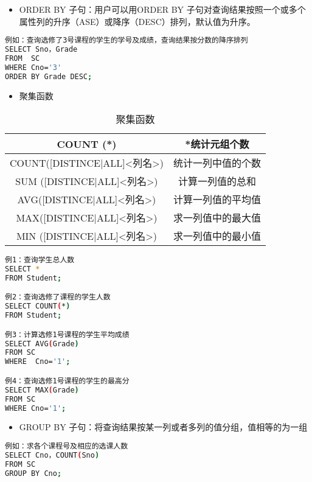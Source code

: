 \begin{itemize}
\item ORDER BY 子句：用户可以用ORDER BY 子句对查询结果按照一个或多个属性列的升序（ASE）或降序（DESC）排列，默认值为升序。
\end{itemize}


\begin{lstlisting}[language=bash]
例如：查询选修了3号课程的学生的学号及成绩，查询结果按分数的降序排列
SELECT Sno，Grade
FROM  SC
WHERE Cno='3'
ORDER BY Grade DESC;
\end{lstlisting}

\begin{itemize}
\item 聚集函数
\end{itemize}

\begin{table}[ht]
\centering
\caption{聚集函数}\label{tab_SQLgrm2}
\begin{tabular}{|c|c|}
\hline
COUNT (*) & *统计元组个数 \\
\hline
COUNT([DISTINCE|ALL]<列名>) & 统计一列中值的个数\\
\hline
SUM ([DISTINCE|ALL]<列名>)& 计算一列值的总和 \\
\hline
AVG([DISTINCE|ALL]<列名>) & 计算一列值的平均值\\
\hline
 MAX([DISTINCE|ALL]<列名>)& 求一列值中的最大值 \\
\hline
MIN ([DISTINCE|ALL]<列名>) & 求一列值中的最小值 \\
\hline
\end{tabular}
\end{table}

\begin{lstlisting}[language=bash]
例1：查询学生总人数
SELECT *
FROM Student;

例2：查询选修了课程的学生人数
SELECT COUNT(*)
FROM Student;

例3：计算选修1号课程的学生平均成绩
SELECT AVG(Grade)
FROM SC
WHERE  Cno='1';

例4：查询选修1号课程的学生的最高分
SELECT MAX(Grade)
FROM SC
WHERE Cno='1';
\end{lstlisting}

\begin{itemize}
\item  GROUP BY 子句：将查询结果按某一列或者多列的值分组，值相等的为一组 
\end{itemize}



\begin{lstlisting}[language=bash]
例如：求各个课程号及相应的选课人数
SELECT Cno，COUNT(Sno)
FROM SC
GROUP BY Cno;
\end{lstlisting}


